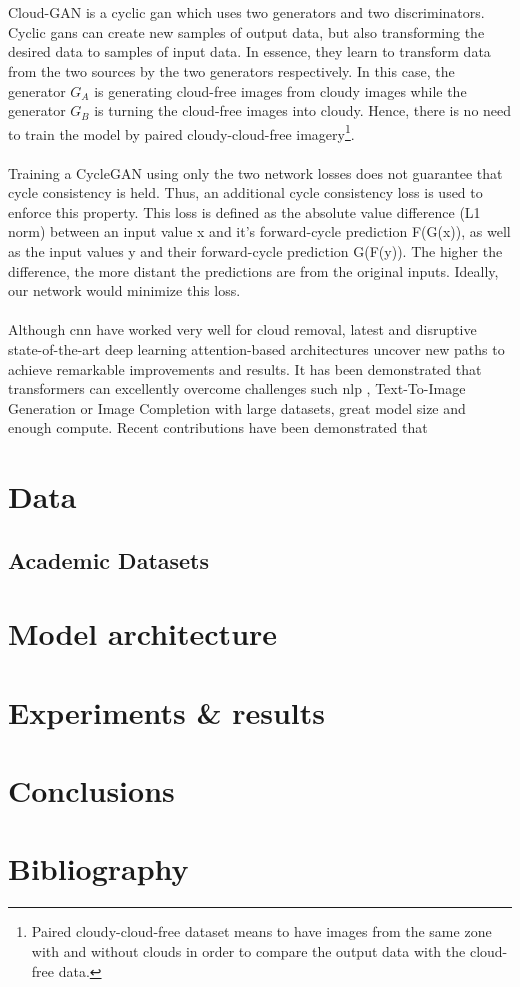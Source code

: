 \documentclass[11pt, a4paper]{article}
\begin{document}
	\\
	\\
	Cloud-GAN \cite{8519033} is a cyclic \gls{gan} which uses two generators and two discriminators. Cyclic \gls{gan}s can create new samples of output data, but also transforming the desired data to samples of input data. In essence, they learn to transform data from the two sources by the two generators respectively. In this case, the generator $G_A$ is generating cloud-free images from cloudy images while the generator $G_B$ is turning the cloud-free images into cloudy. Hence, there is no need to train the model by paired cloudy-cloud-free imagery\footnote{Paired cloudy-cloud-free dataset means to have images from the same zone with and without clouds in order to compare the output data with the cloud-free data.}.
	\\
	\\
	Training a CycleGAN using only the two network losses does not guarantee that cycle consistency is held. Thus, an additional cycle consistency loss is used to enforce this property. This loss is defined as the absolute value difference (L1 norm) between an input value x and it's forward-cycle prediction F(G(x)), as well as the input values y and their forward-cycle prediction G(F(y)). The higher the difference, the more distant the predictions are from the original inputs. Ideally, our network would minimize this loss.
	\\
	\\
	Although \gls{cnn} have worked very well for cloud removal, latest and disruptive state-of-the-art deep learning attention-based architectures \cite{VaswaniSPUJGKP17} uncover new paths to achieve remarkable improvements and results. It has been demonstrated that transformers can excellently overcome challenges such \gls{nlp} \cite{brown2020language} 
	, Text-To-Image Generation \cite{pmlr-v139-ramesh21a}  or Image Completion \cite{pmlr-v119-chen20s} with large datasets, great model size and enough compute. Recent contributions have been demonstrated that 
	\section{Data}
	\subsection{Academic Datasets}
	\section{Model architecture}
	
	\section{Experiments \& results}
	\section{Conclusions}
	\section{Bibliography}

	
	
\end{document}
